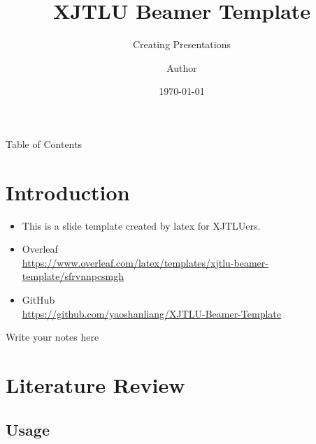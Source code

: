 \documentclass{libs/XJTLU_format}
\title[XJTLU Beamer Template]{\huge\textbf{XJTLU Beamer Template}}
\subtitle{Creating Presentations}
\author{Author}
\institute[XJTLU]{
    \normalsize{\email{author@xjtlu.edu.cn}}
    \newline
    \department{School of Advanced Technology}
    \newline
    \university{Xi’an Jiaotong-Liverpool University}
}
\date{\today}
\begin{document}


\begin{frame}{}
    \maketitle
\end{frame}

\begin{frame}{Table of Contents}
    \begin{multicols}{2}
        \tableofcontents
    \end{multicols}
\end{frame}

\section{Introduction}

\begin{frame}
    \begin{itemize}[<+-| alert@+>] %
    	\item This is a slide template created by latex for XJTLUers.
        \item Overleaf  \\ \url{https://www.overleaf.com/latex/templates/xjtlu-beamer-template/sfrvnnpcsmgh}
        \item GitHub \\ \url{https://github.com/yaoshanliang/XJTLU-Beamer-Template}
    \end{itemize}
    
    \begin{note}
        {Write your notes here}
    \end{note}
\end{frame}

\section{Literature Review}

\subsection{Usage}
\end{document}
